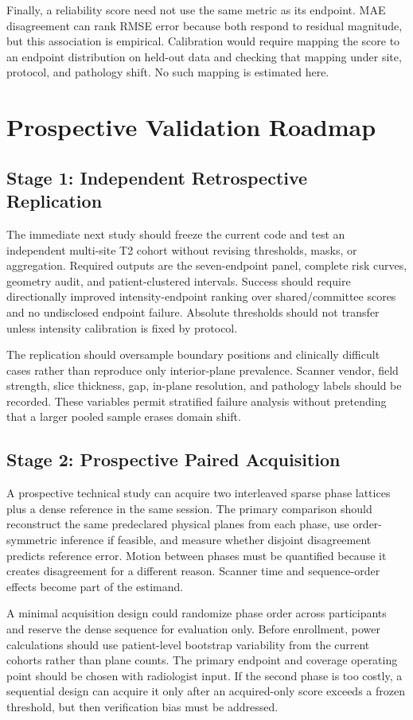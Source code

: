 \documentclass[journal,10pt]{IEEEtran}
\begin{document}
Finally, a reliability score need not use the same metric as its endpoint. MAE disagreement can rank RMSE error because both respond to residual magnitude, but this association is empirical. Calibration would require mapping the score to an endpoint distribution on held-out data and checking that mapping under site, protocol, and pathology shift. No such mapping is estimated here.

\section{Prospective Validation Roadmap}
\subsection{Stage 1: Independent Retrospective Replication}
The immediate next study should freeze the current code and test an independent multi-site T2 cohort without revising thresholds, masks, or aggregation. Required outputs are the seven-endpoint panel, complete risk curves, geometry audit, and patient-clustered intervals. Success should require directionally improved intensity-endpoint ranking over shared/committee scores and no undisclosed endpoint failure. Absolute thresholds should not transfer unless intensity calibration is fixed by protocol.

The replication should oversample boundary positions and clinically difficult cases rather than reproduce only interior-plane prevalence. Scanner vendor, field strength, slice thickness, gap, in-plane resolution, and pathology labels should be recorded. These variables permit stratified failure analysis without pretending that a larger pooled sample erases domain shift.

\subsection{Stage 2: Prospective Paired Acquisition}
A prospective technical study can acquire two interleaved sparse phase lattices plus a dense reference in the same session. The primary comparison should reconstruct the same predeclared physical planes from each phase, use order-symmetric inference if feasible, and measure whether disjoint disagreement predicts reference error. Motion between phases must be quantified because it creates disagreement for a different reason. Scanner time and sequence-order effects become part of the estimand.

A minimal acquisition design could randomize phase order across participants and reserve the dense sequence for evaluation only. Before enrollment, power calculations should use patient-level bootstrap variability from the current cohorts rather than plane counts. The primary endpoint and coverage operating point should be chosen with radiologist input. If the second phase is too costly, a sequential design can acquire it only after an acquired-only score exceeds a frozen threshold, but then verification bias must be addressed.
\end{document}
